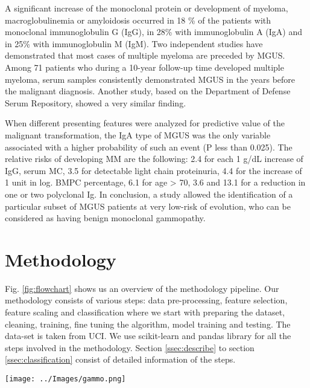 \documentclass[conference]{IEEEtran}
\begin{document}
A significant increase of the monoclonal protein or development of myeloma, macroglobulinemia or amyloidosis occurred in 18 \% of the patients with monoclonal immunoglobulin G (IgG), in 28\% with immunoglobulin A (IgA) and in 25\% with immunoglobulin M (IgM). \cite{monoclonal2} Two independent studies have demonstrated that most cases of multiple myeloma are preceded by MGUS. Among 71 patients who during a 10-year follow-up time developed multiple myeloma, serum samples consistently demonstrated MGUS in the years before the malignant diagnosis. \cite{monoclonal13} Another study, based on the Department of Defense Serum Repository, showed a very similar finding. \cite{monoclonal14}

\par

When different presenting features were analyzed for predictive value of the malignant transformation, the IgA type of MGUS was the only variable associated with a higher probability of such an event (P less than 0.025). \cite{monoclonal4} The relative risks of developing MM are the following: 2.4 for each 1 g/dL increase of IgG, serum MC, 3.5 for detectable light chain proteinuria, 4.4 for the increase of 1 unit in log. BMPC percentage, 6.1 for age \textgreater \hspace{0.1cm}  70, 3.6 and 13.1 for a reduction in one or two polyclonal Ig. In conclusion, a study allowed the identification of a particular subset of MGUS patients at very low-risk of evolution, who can be considered as having benign monoclonal gammopathy. \cite{monoclonal5}

\section{Methodology}
Fig. \ref{fig:flowchart} shows us an overview of the methodology pipeline. Our methodology consists of various steps: data pre-processing, feature selection, feature scaling and classification where we start with preparing the dataset, cleaning, training, fine tuning the algorithm, model training and testing. The data-set is taken from UCI\cite{uci}. We use scikit-learn \cite{scikit} and pandas library for all the steps involved in the methodology. Section \ref{ssec:describe} to section \ref{ssec:classification} consist of detailed information of the steps.
\par
\begin{figure*}[t]
	\centering
	\texttt{[image: ../Images/gammo.png]}
	\caption{Methodology Pipeline Overview}
	\label{fig:flowchart}
\end{figure*}
\end{document}
